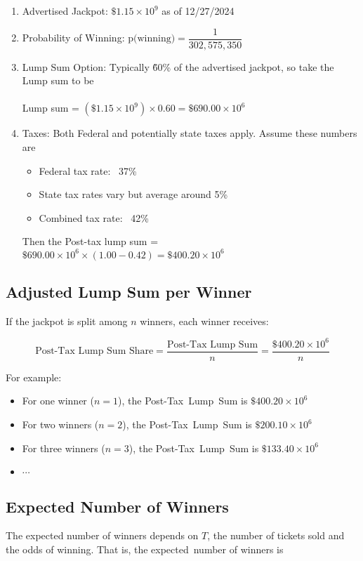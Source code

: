 \documentclass{article}
\theoremstyle{definition}
\begin{document}
\begin{enumerate}
\item Advertised Jackpot: $\$1.15 \times 10^9$ as of 12/27/2024
\item Probability of Winning: $\text{p(winning)} = \dfrac{1}{302,575,350}$
\item Lump Sum Option: Typically \~60\% of the advertised jackpot, so take 
	  the Lump sum to be \\ \\
      Lump sum = $(\$1.15 \times 10^9) \times 0.60 = \$690.00 \times 10^{6}$ 
      \vspace{0.25cm}
\item Taxes: Both Federal and potentially state taxes apply. Assume these numbers are
\begin{itemize}
\item Federal tax rate: ~37\%
\item State tax rates vary but average around 5\%
\item Combined tax rate: ~42\%
\end{itemize}

\medskip
Then the Post-tax lump sum = $\$690.00 \times 10^{6} \times (1.00-0.42) = \$400.20 \times 10^6$
\end{enumerate}

\subsection{Adjusted Lump Sum per Winner}
If the jackpot is split among $n$ winners, each winner receives:

\medskip
\begin{equation*}
\text{Post-Tax Lump Sum Share} = \dfrac{\text{Post-Tax Lump Sum}}{n} = \dfrac{\$400.20 \times 10^6}{n}
\end{equation*}

\bigskip
\noindent
For example:

\begin{itemize}
\item For one winner ($n=1$), the Post-Tax Lump Sum is $\$400.20 \times 10^6$
\item For two winners ($n=2$), the Post-Tax Lump Sum is $\$200.10 \times 10^6$
\item For three winners ($n=3$), the Post-Tax Lump Sum is $\$133.40 \times 10^6$
\item $\cdots$
\end{itemize}

\subsection{Expected Number of Winners}
The expected number of winners depends on $T$, the number of
tickets sold and the odds of winning. That is, the
expected number of winners is
\end{document}
